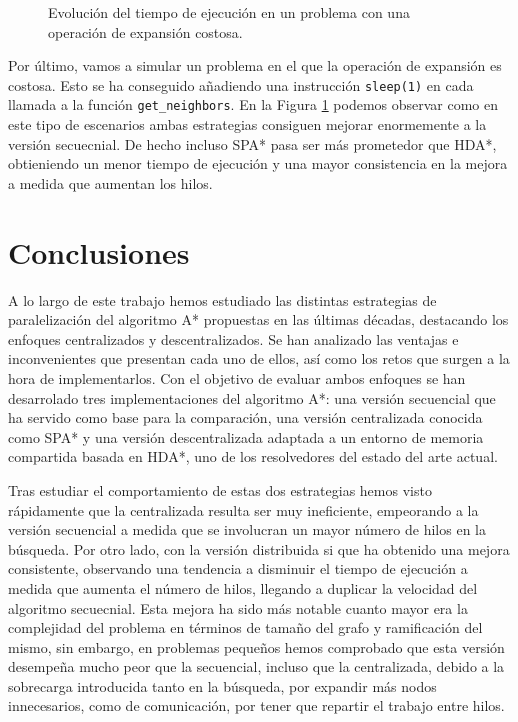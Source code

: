 \documentclass[a4paper,12pt]{article}
\begin{document}
\begin{figure}[h]
\centering

\caption{Evolución del tiempo de ejecución en un problema con una operación de expansión costosa.}
\label{fig:slowexp}
\end{figure}

Por último, vamos a simular un problema en el que la operación de expansión es costosa. Esto se ha conseguido añadiendo una instrucción \verb|sleep(1)| en cada llamada a la función \verb|get_neighbors|. En la Figura \ref{fig:slowexp} podemos observar como en este tipo de escenarios ambas estrategias consiguen mejorar enormemente a la versión secuecnial. De hecho incluso SPA* pasa ser más prometedor que HDA*, obtieniendo un menor tiempo de ejecución y una mayor consistencia en la mejora a medida que aumentan los hilos.

\newpage
\section{Conclusiones} \label{sec:conclusiones}

A lo largo de este trabajo hemos estudiado las distintas estrategias de paralelización del algoritmo A* propuestas en las últimas décadas, destacando los enfoques centralizados y descentralizados. Se han analizado las ventajas e inconvenientes que presentan cada uno de ellos, así como los retos que surgen a la hora de implementarlos. Con el objetivo de evaluar ambos enfoques se han desarrolado tres implementaciones del algoritmo A*: una versión secuencial que ha servido como base para la comparación, una versión centralizada conocida como SPA* y una versión descentralizada adaptada a un entorno de memoria compartida basada en HDA*, uno de los resolvedores del estado del arte actual.

Tras estudiar el comportamiento de estas dos estrategias hemos visto rápidamente que la centralizada resulta ser muy ineficiente, empeorando a la versión secuencial a medida que se involucran un mayor número de hilos en la búsqueda. Por otro lado, con la versión distribuida si que ha obtenido una mejora consistente, observando una tendencia a disminuir el tiempo de ejecución a medida que aumenta el número de hilos, llegando a duplicar la velocidad del algoritmo secuecnial. Esta mejora ha sido más notable cuanto mayor era la complejidad del problema en términos de tamaño del grafo y ramificación del mismo, sin embargo, en problemas pequeños hemos comprobado que esta versión desempeña mucho peor que la secuencial, incluso que la centralizada, debido a la sobrecarga introducida tanto en la búsqueda, por expandir más nodos innecesarios, como de comunicación, por tener que repartir el trabajo entre hilos.
\end{document}
